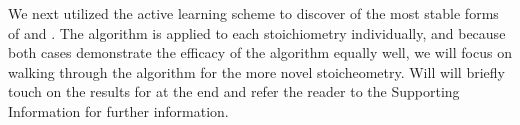 %



%
We next utilized the active learning scheme to discover of the most stable forms of \IrOtwo and \IrOthree.
%
The algorithm is applied to each stoichiometry individually, and because both cases demonstrate the efficacy of the algorithm equally well, we will focus on walking through the algorithm for the more novel \IrOthree stoicheometry.
%
Will will briefly touch on the results for \IrOtwo at the end and refer the reader to the Supporting Information for further information.

